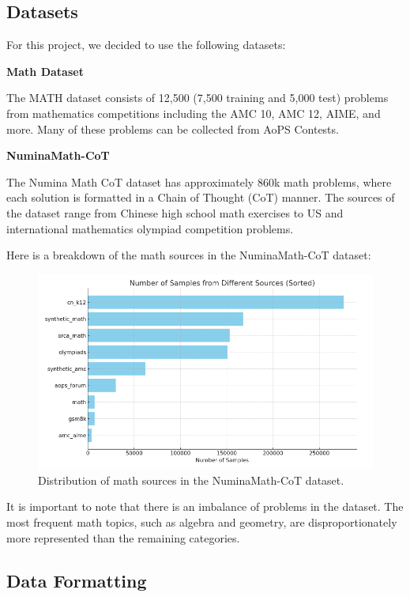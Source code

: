 \documentclass{article}
\begin{document}
\subsection{Datasets}

For this project, we decided to use the following datasets:

{\bf Math Dataset}

The MATH dataset \cite{hendrycksmath2021} consists of 12,500 (7,500 training and 5,000 test) problems from mathematics competitions including the AMC 10, AMC 12, AIME, and more. Many of these problems can be collected from AoPS Contests. \cite{aops_contests}

{\bf NuminaMath-CoT}

The Numina Math CoT dataset has approximately 860k math problems, where each solution is formatted in a Chain of Thought (CoT) manner. The sources of the dataset range from Chinese high school math exercises to US and international mathematics olympiad competition problems.
\cite{numina_math_datasets_CoT}

Here is a breakdown of the math sources in the NuminaMath-CoT dataset:

\begin{figure}[H]
  \centering
  \includegraphics[scale=0.6]{./figures/math_sources.png}
  \caption{Distribution of math sources in the NuminaMath-CoT dataset.}
  \label{fig:math-sources}
\end{figure}

It is important to note that there is an imbalance of problems in the dataset. The most frequent math topics, such as algebra and geometry, are disproportionately more represented than the remaining categories.

\subsection{Data Formatting}
\end{document}
